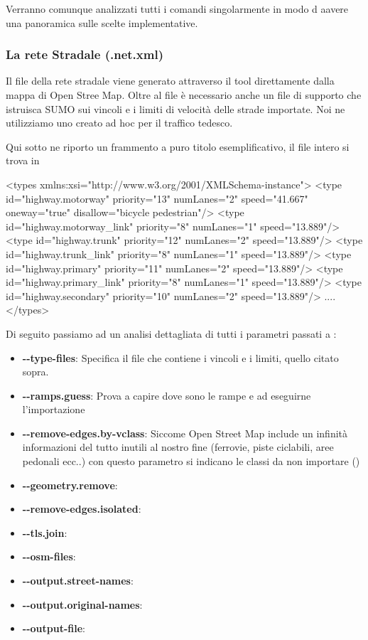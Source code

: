Verranno comunque analizzati tutti i comandi singolarmente in modo d aavere una panoramica sulle scelte implementative.

\subsubsection{La rete Stradale (.net.xml)}

Il file della rete stradale viene generato attraverso il tool  direttamente dalla mappa di Open Stree Map. Oltre al file  è necessario anche un file di supporto che istruisca SUMO sui vincoli e i limiti di velocità delle strade importate. Noi ne utilizziamo uno creato ad hoc per il traffico tedesco. 

Qui sotto ne riporto un frammento a puro titolo esemplificativo, il file intero si trova in 

\begin{xml}
<types xmlns:xsi="http://www.w3.org/2001/XMLSchema-instance">
  <type id="highway.motorway" priority="13" numLanes="2" speed="41.667"
                oneway="true" disallow="bicycle pedestrian"/>
  <type id="highway.motorway_link" priority="8" numLanes="1" speed="13.889"/>
  <type id="highway.trunk" priority="12" numLanes="2" speed="13.889"/>
  <type id="highway.trunk_link" priority="8" numLanes="1" speed="13.889"/>
  <type id="highway.primary" priority="11" numLanes="2" speed="13.889"/>
  <type id="highway.primary_link" priority="8" numLanes="1" speed="13.889"/>
  <type id="highway.secondary" priority="10" numLanes="2" speed="13.889"/>
  ....
</types> 
\end{xml}

Di seguito passiamo ad un analisi dettagliata di tutti i parametri passati a :

\begin{itemize}
	\item \textbf{-{}-type-files}: Specifica il file che contiene i vincoli e i limiti, quello citato sopra.
	\item \textbf{-{}-ramps.guess}: Prova a capire dove sono le rampe e ad eseguirne l'importazione
	\item \textbf{-{}-remove-edges.by-vclass}: Siccome Open Street Map include un infinità informazioni del tutto inutili al nostro fine (ferrovie, piste ciclabili, aree pedonali ecc..) con questo parametro si indicano le classi da non importare ()
	\item \textbf{-{}-geometry.remove}:
	\item \textbf{-{}-remove-edges.isolated}:
	\item \textbf{-{}-tls.join}:
	\item \textbf{-{}-osm-files}:
	\item \textbf{-{}-output.street-names}:
	\item \textbf{-{}-output.original-names}:
	\item \textbf{-{}-output-file}:
\end{itemize}

